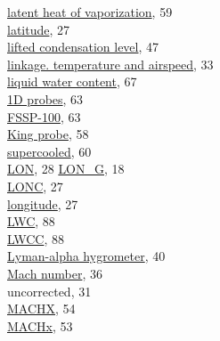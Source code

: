 \documentclass[
]{article}
\begin{document}
\href{./3-the-state-of-the-aircraft.html\#thetae}{latent heat of
vaporization}, 59\\
\href{./3-the-state-of-the-aircraft.html\#latitude}{latitude}, 27\\
\href{./3-the-state-of-the-aircraft.html\#thetae}{lifted condensation
level}, 47\\
\href{./4-the-state-of-the-atmosphere.html\#atx}{linkage. temperature
and airspeed}, 33\\
\href{./5-cloud-physics-variables.html\#plwcc}{liquid water content},
67\\
\hspace*{0.333em}\hspace*{0.333em}\href{./5-cloud-physics-variables.html\#PSD-LWC}{1D
probes}, 63\\
\hspace*{0.333em}\hspace*{0.333em}\href{./5-cloud-physics-variables.html\#PSD-LWC}{FSSP-100},
63\\
\hspace*{0.333em}\hspace*{0.333em}\href{./5-cloud-physics-variables.html\#plwcc}{King
probe}, 58\\
\hspace*{0.333em}\hspace*{0.333em}\href{./5-cloud-physics-variables.html\#rice}{supercooled},
60\\
\href{./3-the-state-of-the-aircraft.html\#longitude}{LON}, 28
\href{./3-the-state-of-the-aircraft.html\#gglon}{LON\_G}, 18\\
\href{./3-the-state-of-the-aircraft.html\#latc-lonc}{LONC}, 27\\
\href{./3-the-state-of-the-aircraft.html\#longitude}{longitude}, 27\\
\href{./5-cloud-physics-variables.html\#plwcc}{LWC}, 88\\
\href{./10-obsolete-variables.html\#jwlw-corrected\%7C}{LWCC}, 88\\
\href{./4-the-state-of-the-atmosphere.html\#humidity}{Lyman-alpha
hygrometer}, 40\\
\href{./3-the-state-of-the-aircraft.html\#psx}{Mach number}, 36\\
\hspace*{0.333em}\hspace*{0.333em}uncorrected, 31\\
\href{./4-the-state-of-the-atmosphere.html\#mach-number}{MACHX}, 54\\
\href{./4-the-state-of-the-atmosphere.html\#mach-number}{MACHx}, 53\\
\end{document}
